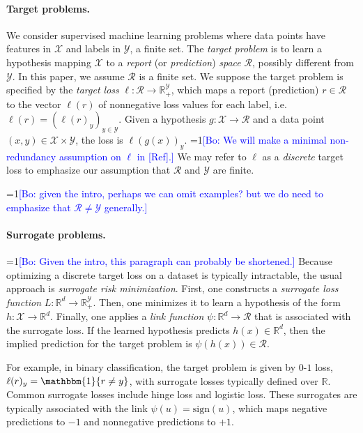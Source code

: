\documentclass{article}
\theoremstyle{definition}\newtheorem{definition}{Definition}
\theoremstyle{definition}\newtheorem{assumption}{Assumption}
\newcommand{\Comments}{1}
\newcommand{\mynote}[2]{\ifnum\Comments=1\textcolor{#1}{#2}\fi}
\newcommand{\bo}[1]{\mynote{blue}{[Bo: #1]}}
\newcommand{\reals}{\mathbb{R}}
\newcommand{\R}{\mathcal{R}}
\newcommand{\X}{\mathcal{X}}
\newcommand{\Y}{\mathcal{Y}}
\newcommand{\ones}{\mathbbm{1}}
\begin{document}
\paragraph{Target problems.}
We consider supervised machine learning problems where data points have features in $\X$ and labels in $\Y$, a finite set.
The \emph{target problem} is to learn a hypothesis mapping $\X$ to a \emph{report} (or \emph{prediction}) \emph{space} $\R$, possibly different from $\Y$.
In this paper, we assume $\R$ is a finite set.
We suppose the target problem is specified by the \emph{target loss} $\ell:\R\to\reals^\Y_+$, which maps a report (prediction) $r \in \R$ to the vector $\ell(r)$ of nonnegative loss values for each label, i.e. $\ell(r) = (\ell(r)_y)_{y\in\Y}$.
Given a hypothesis $g: \X \to \R$ and a data point $(x,y) \in \X \times \Y$, the loss is $\ell(g(x))_y$.
\bo{We will make a minimal non-redundancy assumption on $\ell$ in [Ref].}
We may refer to $\ell$ as a \emph{discrete} target loss to emphasize our assumption that $\R$ and $\Y$ are finite.

\bo{given the intro, perhaps we can omit examples? but we do need to emphasize that $\R \neq \Y$ generally.}



\paragraph{Surrogate problems.}
\bo{Given the intro, this paragraph can probably be shortened.}
Because optimizing a discrete target loss on a dataset is typically intractable, the usual approach is \emph{surrogate risk minimization}.
First, one constructs a \emph{surrogate loss function} $L:\reals^d\to\reals^\Y_+$.
Then, one minimizes it to learn a hypothesis of the form $h: \X \to \reals^d$.
Finally, one applies a \emph{link function} $\psi: \reals^d \to \R$ that is associated with the surrogate loss.
If the learned hypothesis predicts $h(x) \in \reals^d$, then the implied prediction for the target problem is $\psi(h(x)) \in \R$.

For example, in binary classification, the target problem is given by $0$-$1$ loss, $\ell(r)_y = \ones\{r\neq y\}$, with surrogate losses typically defined over $\reals$.
Common surrogate losses include hinge loss and logistic loss.
These surrogates are typically associated with the link $\psi(u) = \mathrm{sign}(u)$, which maps negative predictions to $-1$ and nonnegative predictions to $+1$.
\end{document}
